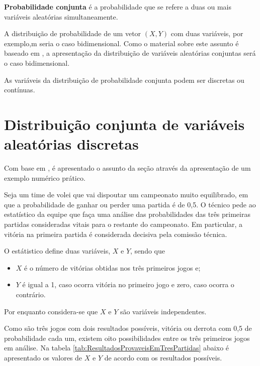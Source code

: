\documentclass[
]{book}
\begin{document}
\textbf{Probabilidade conjunta} é a probabilidade que se refere a duas ou mais variáveis aleatórias simultaneamente.

A distribuição de probabilidade de um vetor \((X,Y)\) com duas variáveis, por exemplo,m seria o caso bidimensional. Como o material sobre este assunto é baseado em \citet{Sartoris2013}, a apresentação da distribuição de variáveis aleatórias conjuntas será o caso bidimensional.

As variáveis da distribuição de probabilidade conjunta podem ser discretas ou contínuas.

\hypertarget{distribuiuxe7uxe3o-conjunta-de-variuxe1veis-aleatuxf3rias-discretas}{%
\section{Distribuição conjunta de variáveis aleatórias discretas}\label{distribuiuxe7uxe3o-conjunta-de-variuxe1veis-aleatuxf3rias-discretas}}

Com base em \citet{Sartoris2013}, é apresentado o assunto da seção através da apresentação de um exemplo numérico prático.

Seja um time de volei que vai dispoutar um campeonato muito equilibrado, em que a probabilidade de ganhar ou perder uma partida é de 0,5. O técnico pede ao estatístico da equipe que faça uma análise das probabilidades das três primeiras partidas consideradas vitais para o restante do campeonato. Em particular, a vitória na primeira partida é considerada decisiva pela comissão técnica.

O estátistico define duas variáveis, \(X\) e \(Y\), sendo que

\begin{itemize}
\item
  \(X\) é o número de vitórias obtidas nos três primeiros jogos e;
\item
  \(Y\) é igual a 1, caso ocorra vitória no primeiro jogo e zero, caso ocorra o contrário.
\end{itemize}

Por enquanto considera-se que \(X\) e \(Y\) são variáveis independentes.

Como são três jogos com dois resultados possíveis, vitória ou derrota com 0,5 de probabilidade cada um, existem oito possibilidades entre os três primeiros jogos em análise. Na tabela \ref{tab:ResultadosProvaveisEmTresPartidas} abaixo é apresentado os valores de \(X\) e \(Y\) de acordo com os resultados possíveis.
\end{document}
